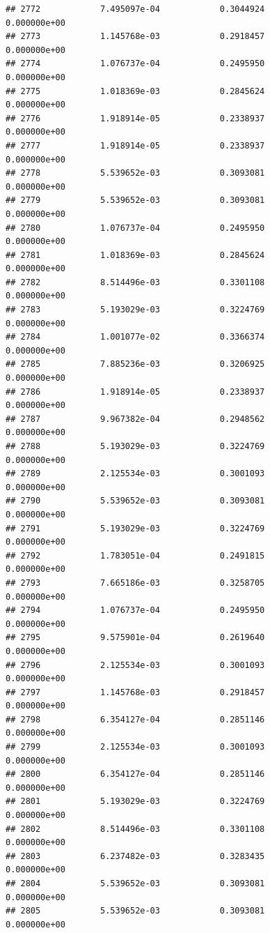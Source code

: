 \documentclass[
]{article}
\begin{document}
\begin{verbatim}
## 2772            7.495097e-04            0.3044924            0.000000e+00
## 2773            1.145768e-03            0.2918457            0.000000e+00
## 2774            1.076737e-04            0.2495950            0.000000e+00
## 2775            1.018369e-03            0.2845624            0.000000e+00
## 2776            1.918914e-05            0.2338937            0.000000e+00
## 2777            1.918914e-05            0.2338937            0.000000e+00
## 2778            5.539652e-03            0.3093081            0.000000e+00
## 2779            5.539652e-03            0.3093081            0.000000e+00
## 2780            1.076737e-04            0.2495950            0.000000e+00
## 2781            1.018369e-03            0.2845624            0.000000e+00
## 2782            8.514496e-03            0.3301108            0.000000e+00
## 2783            5.193029e-03            0.3224769            0.000000e+00
## 2784            1.001077e-02            0.3366374            0.000000e+00
## 2785            7.885236e-03            0.3206925            0.000000e+00
## 2786            1.918914e-05            0.2338937            0.000000e+00
## 2787            9.967382e-04            0.2948562            0.000000e+00
## 2788            5.193029e-03            0.3224769            0.000000e+00
## 2789            2.125534e-03            0.3001093            0.000000e+00
## 2790            5.539652e-03            0.3093081            0.000000e+00
## 2791            5.193029e-03            0.3224769            0.000000e+00
## 2792            1.783051e-04            0.2491815            0.000000e+00
## 2793            7.665186e-03            0.3258705            0.000000e+00
## 2794            1.076737e-04            0.2495950            0.000000e+00
## 2795            9.575901e-04            0.2619640            0.000000e+00
## 2796            2.125534e-03            0.3001093            0.000000e+00
## 2797            1.145768e-03            0.2918457            0.000000e+00
## 2798            6.354127e-04            0.2851146            0.000000e+00
## 2799            2.125534e-03            0.3001093            0.000000e+00
## 2800            6.354127e-04            0.2851146            0.000000e+00
## 2801            5.193029e-03            0.3224769            0.000000e+00
## 2802            8.514496e-03            0.3301108            0.000000e+00
## 2803            6.237482e-03            0.3283435            0.000000e+00
## 2804            5.539652e-03            0.3093081            0.000000e+00
## 2805            5.539652e-03            0.3093081            0.000000e+00

\end{verbatim}
\end{document}
